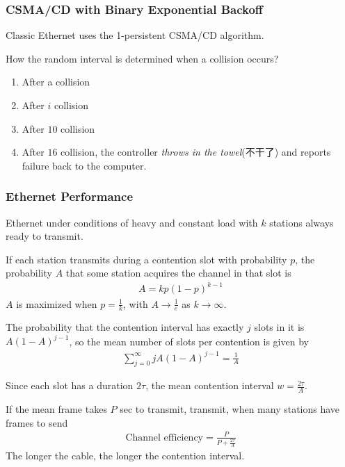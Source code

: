 \subsubsection{CSMA/CD with Binary Exponential Backoff}
Classic Ethernet uses the 1-persistent CSMA/CD algorithm. 

How the random interval is determined when a collision occurs?%
\begin{enumerate}
    \item After a collision
    \item After $i$ collision
    \item After $10$ collision
    \item After $16$ collision, the controller \textit{throws in the towel}(不干了) and reports failure back to the computer. 
\end{enumerate}

\subsubsection{Ethernet Performance}
Ethernet under conditions of heavy and constant load with $k$ stations always ready to transmit.

If each station transmits during a contention slot with probability $p$, the probability $A$ that some station acquires the channel in that slot is 
\begin{align*}
    A=kp(1-p)^{k-1}
\end{align*}
$A$ is maximized when $p=\frac{1}{k}$, with $A\to \frac{1}{e}$ as $k\to\infty$. 

The probability that the contention interval has exactly $j$ slots in it is $A(1-A)^{j-1}$, so the mean number of slots per contention is given by
\begin{align*}
    \sum_{j=0}^\infty jA(1-A)^{j-1}=\frac{1}{A}
\end{align*}

Since each slot has a duration $2\tau$, the mean contention interval $w=\frac{2\tau}{A}$. 

If the mean frame takes $P$ sec to transmit,  transmit, when many stations have frames to send
\begin{align*}
    \text{Channel efficiency}=\frac{P}{P+\frac{2\tau}{A}}
\end{align*}
The longer the cable, the longer the contention interval. 

